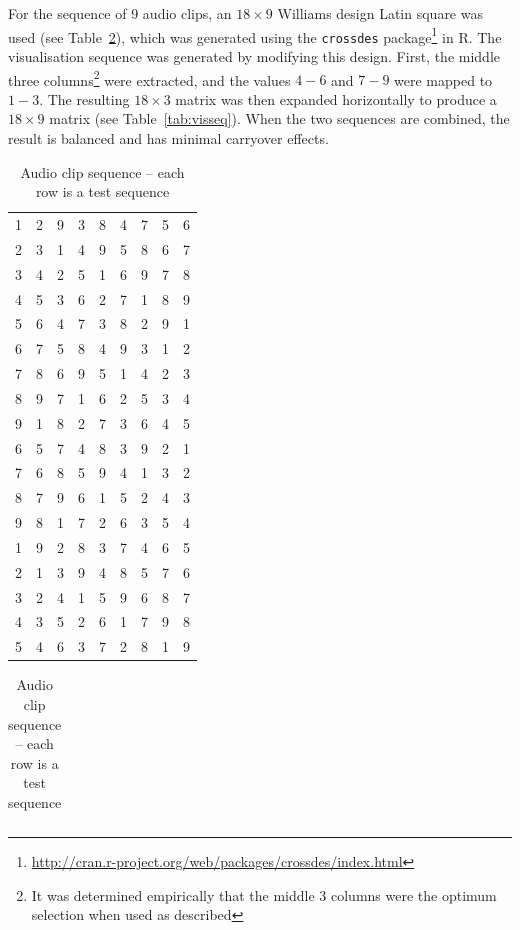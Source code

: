 For the sequence of 9 audio clips, an $18\times9$ Williams design Latin square
was used (see Table~\ref{tab:clipseq}), which was generated using the
\texttt{crossdes}
package\footnote{\url{http://cran.r-project.org/web/packages/crossdes/index.html}}
in R. The visualisation sequence was generated by modifying this design. First,
the middle three columns\footnote{It was determined empirically that the
  middle 3 columns were the optimum selection when used as described} were
extracted, and the values $4-6$ and $7-9$ were mapped to $1-3$. The resulting
$18\times3$ matrix was then expanded horizontally to produce a $18\times9$
matrix (see Table~\ref{tab:visseq}). When the two sequences are combined, the
result is balanced and has minimal carryover effects.

\begin{table}
  \parbox{.45\linewidth}{
    \centering
    \begin{tabular}{rrrrrrrrr}

      1 & 2 & 9 & 3 & 8 & 4 & 7 & 5 & 6 \\ 
      2 & 3 & 1 & 4 & 9 & 5 & 8 & 6 & 7 \\ 
      3 & 4 & 2 & 5 & 1 & 6 & 9 & 7 & 8 \\ 
      4 & 5 & 3 & 6 & 2 & 7 & 1 & 8 & 9 \\ 
      5 & 6 & 4 & 7 & 3 & 8 & 2 & 9 & 1 \\ 
      6 & 7 & 5 & 8 & 4 & 9 & 3 & 1 & 2 \\ 
      7 & 8 & 6 & 9 & 5 & 1 & 4 & 2 & 3 \\ 
      8 & 9 & 7 & 1 & 6 & 2 & 5 & 3 & 4 \\ 
      9 & 1 & 8 & 2 & 7 & 3 & 6 & 4 & 5 \\ 
      6 & 5 & 7 & 4 & 8 & 3 & 9 & 2 & 1 \\ 
      7 & 6 & 8 & 5 & 9 & 4 & 1 & 3 & 2 \\ 
      8 & 7 & 9 & 6 & 1 & 5 & 2 & 4 & 3 \\ 
      9 & 8 & 1 & 7 & 2 & 6 & 3 & 5 & 4 \\ 
      1 & 9 & 2 & 8 & 3 & 7 & 4 & 6 & 5 \\ 
      2 & 1 & 3 & 9 & 4 & 8 & 5 & 7 & 6 \\ 
      3 & 2 & 4 & 1 & 5 & 9 & 6 & 8 & 7 \\ 
      4 & 3 & 5 & 2 & 6 & 1 & 7 & 9 & 8 \\ 
      5 & 4 & 6 & 3 & 7 & 2 & 8 & 1 & 9 \\ 
    \end{tabular}
    \caption{Audio clip sequence -- each row is a test sequence}
    \label{tab:clipseq}
  }
  \hfill
  \parbox{.45\linewidth}{
    \centering
    \begin{tabular}{rrrrrrrrr}


\end{tabular}}
\end{table}
